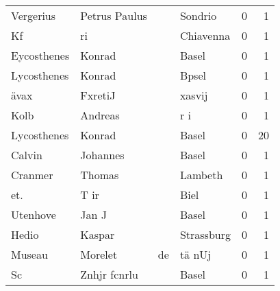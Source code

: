 \begin{tabular}{llllrr}
                Vergerius &                      Petrus Paulus &             &                                     Sondrio &          0 &         1 \\
                       Kf &                                 ri &             &                                   Chiavenna &          0 &         1 \\
              Eycosthenes &                             Konrad &             &                                       Basel &          0 &         1 \\
              Lycosthenes &                             Konrad &             &                                       Bpsel &          0 &         1 \\
                     ävax &                            FxretiJ &             &                                      xasvij &          0 &         1 \\
                     Kolb &                            Andreas &             &                                         r i &          0 &         1 \\
              Lycosthenes &                             Konrad &             &                                       Basel &          0 &        20 \\
                   Calvin &                           Johannes &             &                                       Basel &          0 &         1 \\
                  Cranmer &                             Thomas &             &                                     Lambeth &          0 &         1 \\
                      et. &                               T ir &             &                                        Biel &          0 &         1 \\
                 Utenhove &                              Jan J &             &                                       Basel &          0 &         1 \\
                    Hedio &                             Kaspar &             &                                  Strassburg &          0 &         1 \\
                   Museau &                            Morelet &          de &                                      tä nUj &          0 &         1 \\
                       Sc &                       Znhjr fcnrlu &             &                                       Basel &          0 &         1 \\

\end{tabular}
